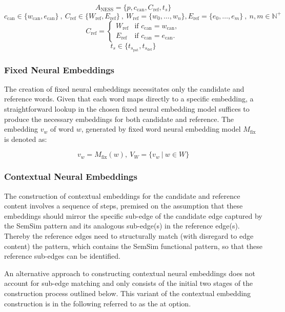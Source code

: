 \documentclass[11pt, numbers=noenddot]{scrreprt}
\begin{document}
\[
A_\text{NESS} = \{p, c_\text{can}, C_\text{ref}, t_s\}
\]
\[
c_\text{can} \in \{w_\text{can}, e_\text{can}\} \ ,\ C_\text{ref} \in \{W_\text{ref}, E_\text{ref}\} \ ,\ W_\text{ref} = \{w_0, \dots, w_n\}, E_\text{ref} = \{e_0, \dots, e_m\} \ ,\ n,m \in \mathbb{N}^+
\]
\[
C_\text{ref} = 
\begin{cases} 
W_\text{ref} & \text{if } c_\text{can} = w_\text{can}, \\
E_\text{ref} & \text{if } c_\text{can} = e_\text{can}.
\end{cases}
\]
\[
t_s \in \{t_{s_\text{pat}}, t_{s_\text{def}}\}
\]

\subsubsection{Fixed Neural Embeddings}
The creation of fixed neural embeddings necessitates only the candidate and reference words. Given that each word maps directly to a specific embedding, a straightforward lookup in the chosen fixed neural embedding model suffices to produce the necessary embeddings for both candidate and reference. The embedding \(v_w\) of word \(w\), generated by fixed word neural embedding model \(M_\text{fix}\) is denoted as:

\[v_w = M_\text{fix}(w),\ V_W = \{v_w\ |\ w \in W\} \]

\subsubsection{Contextual Neural Embeddings}
The construction of contextual embeddings for the candidate and reference content involves a sequence of steps, premised on the assumption that these embeddings should mirror the specific sub-edge of the candidate edge captured by the SemSim pattern and its analogous sub-edge(s) in the reference edge(s). Thereby the reference edges need to structurally match (with disregard to edge content) the pattern, which contains the SemSim functional pattern, so that these reference sub-edges can be identified. 

An alternative approach to constructing contextual neural embeddings does not account for sub-edge matching and only consists of the initial two stages of the construction process outlined below. This variant of the contextual embedding construction is in the following referred to as the \gls{at} option.
\end{document}
